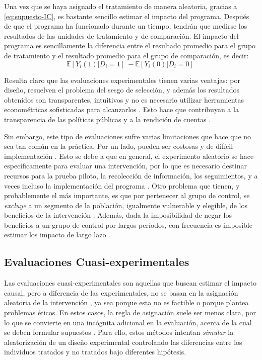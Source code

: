 \documentclass[../../main.tex]{subfiles}
\begin{document}
Una vez que se haya asignado el tratamiento de manera aleatoria, gracias a
\ref{eq:supuesto-IC}, es bastante sencillo estimar el impacto del programa. Después de que
el programa ha funcionado durante un tiempo, tendrán que medirse los resultados de las
unidades de tratamiento y de comparación. El impacto del programa es sencillamente la
diferencia entre el resultado promedio para el grupo de tratamiento y el resultado
promedio para el grupo de comparación, es decir:
\[
\mathbb{E} \left[Y_i(1)|D_i=1\right]\ - \mathbb{E} \left[Y_i(0)|D_i=0\right]\
\]

Resulta claro que las evaluaciones experimentales tienen varias ventajas: por diseño,
resuelven el problema del sesgo de selección, y además los resultados obtenidos son
transparentes, intuitivos y no es necesario utilizar herramientas econométricas
sofisticadas para alcanzarlos \cite{bernal}. Esto hace que contribuyan a la transparencia
de las políticas públicas y a la rendición de cuentas \cite{bernal}.

Sin embargo, este tipo de evaluaciones sufre varias limitaciones que hace que no sea tan
común en la práctica. Por un lado, pueden ser costosas y de difícil implementación
\cite{bernal}. Esto se debe a que en general, el experimento aleatorio se hace
específicamente para evaluar una intervención, por lo que es necesario destinar recursos
para la prueba piloto, la recolección de información, los seguimientos, y a veces incluso
la implementación del programa \cite{bernal}. Otro problema que tienen, y probablemente el
más importante, es que por pertenecer al grupo de control, se \textit{excluye} a un
segmento de la población, igualmente vulnerable y elegible, de los beneficios de la
intervención \cite{bernal}. Además, dada la imposibilidad de negar los beneficios a un
grupo de control por largos períodos, con frecuencia es imposible estimar los impacto de
largo lazo \cite{bernal}.

\subsection{Evaluaciones Cuasi-experimentales}
Las evaluaciones cuasi-experimentales son aquellas que buscan estimar el impacto causal,
pero a diferencia de las experimentales, no se basan en la asignación aleatoria de la
intervención \cite{gertler-2016}, ya sea porque esta no es factible o porque plantea
problemas éticos. En estos casos, la regla de asignación suele ser menos clara, por lo que
se convierte en una incógnita adicional en la evaluación, acerca de la cual se deben
formular supuestos \cite{gertler-2016}. Para ello, estos métodos intentan \textit{simular}
la aleatorización de un diseño experimental controlando las diferencias entre los
individuos tratados y no tratados bajo diferentes hipótesis.
\end{document}
